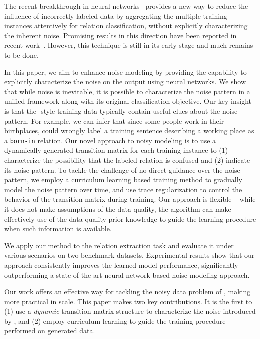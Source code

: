 The recent breakthrough in neural networks~\cite{lin2016neural} provides a new way to reduce the influence of incorrectly labeled data 
by aggregating the multiple training instances attentively for relation classification, without explicitly characterizing the inherent noise. 
Promising results in this direction have been reported in recent work~\red{\cite{}}. However, this technique is still in its early stage and much remains to be done.


In this paper, we aim to enhance \DS noise modeling by providing the capability to explicitly characterize 
the noise on the \DS output using neural networks.  We show that while noise is inevitable, it is possible to characterize the noise pattern  in a unified framework along with its original classification objective. Our key insight is that the \DS-style training  data typically contain useful clues about the noise pattern. For example, we can infer that since some people work in their birthplaces, \DS could wrongly label a training sentence describing a working place as a \texttt{born-in} relation.
Our novel approach to noisy modeling is to use a dynamically-generated transition matrix for each training instance to (1) characterize the possibility that the \DS labeled relation is confused and (2) indicate its noise pattern.  To tackle the challenge of no direct guidance over the noise pattern, we employ a curriculum learning based training method to gradually model the noise pattern over time, and use trace regularization to control the behavior of the transition matrix during training. Our approach is flexible -- while it does not make assumptions of the data quality, the algorithm can make effectively use
of the data-quality prior knowledge to guide the learning procedure when such information is available. 

We apply our method to the relation extraction task and evaluate it under various scenarios on two benchmark datasets. Experimental results show
that our approach consistently improves the learned model performance, significantly outperforming a state-of-the-art neural network based
\DS noise modeling approach. 

Our work offers an effective way for tackling the noisy data problem of \DS, making \DS more practical in scale. This paper makes two key contributions. It is the first to (1) use a \emph{dynamic} transition matrix structure to characterize the noise introduced by \DS, and (2) employ curriculum learning to guide the training procedure performed on \DS generated data.

